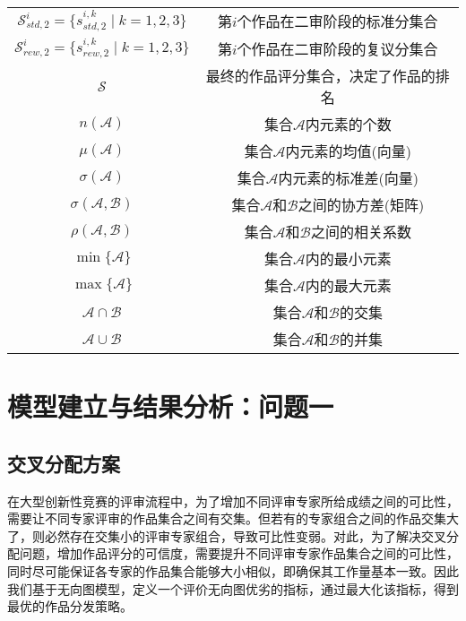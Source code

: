 \documentclass[bwprint]{gmcmthesis}
\begin{document}
\begin{tabular}{cc}
	\midrule[1pt]
	\makebox[0.4\textwidth][c]{符号} &  \makebox[0.5\textwidth][c]{意义} \\ \midrule[1pt]\midrule[1pt]
		$\mathcal{S}^i_{std,2}=\{s^{i,k}_{std,2}\;\vert\; k=1,2,3\}$    & 第$i$个作品在二审阶段的标准分集合  \\ \hline
	$\mathcal{S}^i_{rew,2}=\{s^{i,k}_{rew,2}\;\vert\; k=1,2,3\}$    & 第$i$个作品在二审阶段的复议分集合  \\ \hline
	$\mathcal{S}$    & 最终的作品评分集合，决定了作品的排名  \\ \hline
	$n(\mathcal{A})$    & 集合$\mathcal{A}$内元素的个数  \\ \hline
	$\mu(\mathcal{A})$    & 集合$\mathcal{A}$内元素的均值(向量)  \\ \hline
	$\sigma(\mathcal{A})$    & 集合$\mathcal{A}$内元素的标准差(向量) \\ \hline
	$\sigma(\mathcal{A},\mathcal{B})$    & 集合$\mathcal{A}$和$\mathcal{B}$之间的协方差(矩阵) \\ \hline
	$\rho(\mathcal{A},\mathcal{B})$    & 集合$\mathcal{A}$和$\mathcal{B}$之间的相关系数 \\ \hline
	$\min\{\mathcal{A}\}$    & 集合$\mathcal{A}$内的最小元素 \\ \hline
	$\max\{\mathcal{A}\}$    & 集合$\mathcal{A}$内的最大元素 \\ \hline
	$\mathcal{A}\cap\mathcal{B}$    & 集合$\mathcal{A}$和$\mathcal{B}$的交集 \\ \hline
	$\mathcal{A}\cup\mathcal{B}$    & 集合$\mathcal{A}$和$\mathcal{B}$的并集 \\ \midrule[1pt]
\end{tabular}
\newpage
\section{模型建立与结果分析：问题一 }
\subsection{交叉分配方案}

	\par
	在大型创新性竞赛的评审流程中，为了增加不同评审专家所给成绩之间的可比性，需要让不同专家评审的作品集合之间有交集。但若有的专家组合之间的作品交集大了，则必然存在交集小的评审专家组合，导致可比性变弱。对此，为了解决交叉分配问题，增加作品评分的可信度，需要提升不同评审专家作品集合之间的可比性，同时尽可能保证各专家的作品集合能够大小相似，即确保其工作量基本一致。因此我们基于无向图模型，定义一个评价无向图优劣的指标，通过最大化该指标，得到最优的作品分发策略。
	
\end{document}
